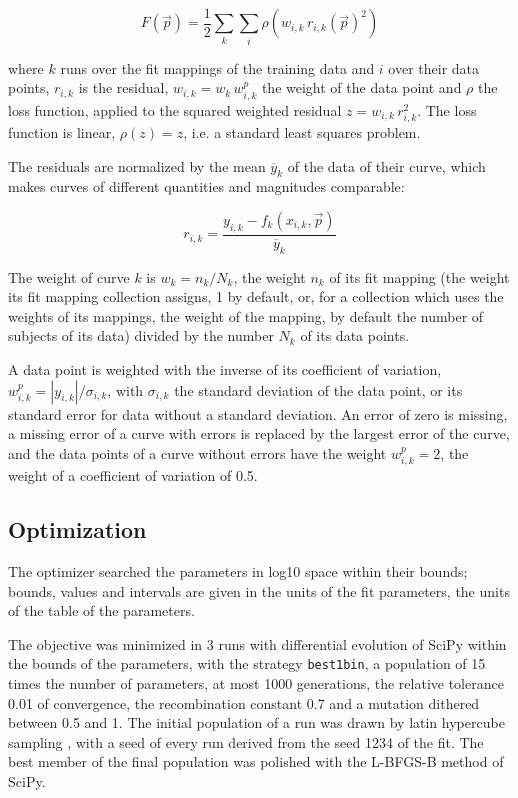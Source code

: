 \documentclass{article}
\begin{document}
\begin{equation}
F(\vec{p}) = \frac{1}{2} \sum_{k} \sum_{i} \rho\left(w_{i,k}\, r_{i,k}(\vec{p})^2\right)
\end{equation}

where $k$ runs over the fit mappings of the training data and $i$ over their data points, $r_{i,k}$ is the residual, $w_{i,k} = w_k\, w^{p}_{i,k}$ the weight of the data point and $\rho$ the loss function, applied to the squared weighted residual $z = w_{i,k}\, r_{i,k}^2$. The loss function is linear, $\rho(z) = z$, i.e. a standard least squares problem.

The residuals are normalized by the mean $\overline{y}_k$ of the data of their curve, which makes curves of different quantities and magnitudes comparable:

\begin{equation}
r_{i,k} = \frac{y_{i,k} - f_k(x_{i,k}, \vec{p})}{\overline{y}_k}
\end{equation}

The weight of curve $k$ is $w_k = n_k / N_k$, the weight $n_k$ of its fit mapping (the weight its fit mapping collection assigns, 1 by default, or, for a collection which uses the weights of its mappings, the weight of the mapping, by default the number of subjects of its data) divided by the number $N_k$ of its data points.

A data point is weighted with the inverse of its coefficient of variation, $w^{p}_{i,k} = |y_{i,k}| / \sigma_{i,k}$, with $\sigma_{i,k}$ the standard deviation of the data point, or its standard error for data without a standard deviation. An error of zero is missing, a missing error of a curve with errors is replaced by the largest error of the curve, and the data points of a curve without errors have the weight $w^{p}_{i,k} = 2$, the weight of a coefficient of variation of 0.5.

\subsection{Optimization}

The optimizer searched the parameters in log10 space within their bounds; bounds, values and intervals are given in the units of the fit parameters, the units of the table of the parameters.

The objective was minimized in 3 runs with differential evolution \cite{Storn1997} of SciPy \cite{Virtanen2020} within the bounds of the parameters, with the strategy \texttt{best1bin}, a population of 15 times the number of parameters, at most 1000 generations, the relative tolerance 0.01 of convergence, the recombination constant 0.7 and a mutation dithered between 0.5 and 1. The initial population of a run was drawn by latin hypercube sampling \cite{McKay1979}, with a seed of every run derived from the seed 1234 of the fit. The best member of the final population was polished with the L-BFGS-B method of SciPy.
\end{document}
